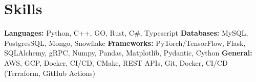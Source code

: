 \vspace{5 pt - 0.3 cm}
\section{Skills}
\begin{onecolentry}
    \textbf{Languages:} Python, C++, GO, Rust, C\#, Typescript \newline
    \textbf{Databases:} MySQL, PostgresSQL, Mongo, Snowflake \newline
    \textbf{Frameworks:} PyTorch/TensorFlow, Flask, SQLAlchemy, gRPC, Numpy, Pandas, Matplotlib, Pydantic, Cython   \newline
    \textbf{General:} AWS, GCP, Docker, CI/CD, CMake, REST APIs, Git, Docker, CI/CD (Terraform, GitHub Actions) \newline
\end{onecolentry}